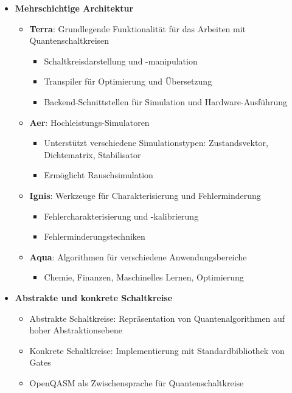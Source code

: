 \begin{itemize}
    \item \textbf{Mehrschichtige Architektur}
    \begin{itemize}
        \item \textbf{Terra}: Grundlegende Funktionalität für das Arbeiten mit Quantenschaltkreisen
        \begin{itemize}
            \item Schaltkreisdarstellung und -manipulation
            \item Transpiler für Optimierung und Übersetzung
            \item Backend-Schnittstellen für Simulation und Hardware-Ausführung
        \end{itemize}
        
        \item \textbf{Aer}: Hochleistungs-Simulatoren
        \begin{itemize}
            \item Unterstützt verschiedene Simulationstypen: Zustandsvektor, Dichtematrix, Stabilisator
            \item Ermöglicht Rauschsimulation
        \end{itemize}
        
        \item \textbf{Ignis}: Werkzeuge für Charakterisierung und Fehlerminderung
        \begin{itemize}
            \item Fehlercharakterisierung und -kalibrierung
            \item Fehlerminderungstechniken
        \end{itemize}
        
        \item \textbf{Aqua}: Algorithmen für verschiedene Anwendungsbereiche
        \begin{itemize}
            \item Chemie, Finanzen, Maschinelles Lernen, Optimierung
        \end{itemize}
    \end{itemize}
    
    \item \textbf{Abstrakte und konkrete Schaltkreise}
    \begin{itemize}
        \item Abstrakte Schaltkreise: Repräsentation von Quantenalgorithmen auf hoher Abstraktionsebene
        \item Konkrete Schaltkreise: Implementierung mit Standardbibliothek von Gates
        \item OpenQASM als Zwischensprache für Quantenschaltkreise
    \end{itemize}
    

\end{itemize}
